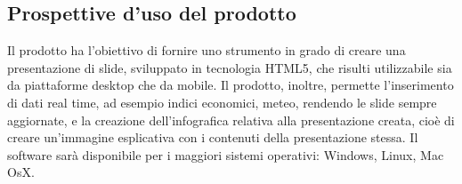 \subsection{Prospettive d'uso del prodotto}
Il prodotto ha l'obiettivo di fornire uno strumento in grado di creare una presentazione di \gls{slide}, sviluppato in tecnologia \gls{HTML5}, che risulti utilizzabile sia da piattaforme desktop che da mobile. Il prodotto, inoltre, permette l'inserimento di dati \gls{real time}, ad esempio indici economici, meteo, rendendo le \gls{slide} sempre aggiornate, e la creazione dell'\gls{infografica} relativa alla presentazione creata, cioè di creare un'immagine esplicativa con i contenuti della presentazione stessa. Il software sarà disponibile per i maggiori sistemi operativi: \gls{Windows}, \gls{Linux}, \gls{Mac OsX}.

